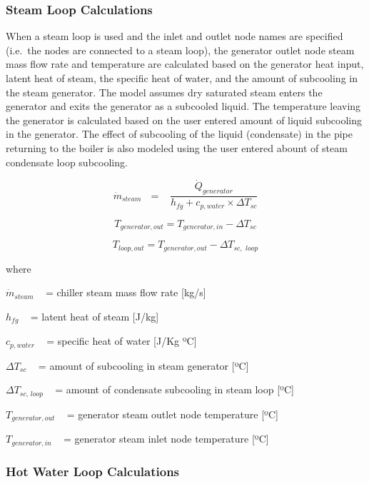 \subsubsection{Steam Loop Calculations}\label{steam-loop-calculations-1}

When a steam loop is used and the inlet and outlet node names are specified (i.e.~the nodes are connected to a steam loop), the generator outlet node steam mass flow rate and temperature are calculated based on the generator heat input, latent heat of steam, the specific heat of water, and the amount of subcooling in the steam generator. The model assumes dry saturated steam enters the generator and exits the generator as a subcooled liquid. The temperature leaving the generator is calculated based on the user entered amount of liquid subcooling in the generator. The effect of subcooling of the liquid (condensate) in the pipe returning to the boiler is also modeled using the user entered abount of steam condensate loop subcooling.

\begin{equation}
{\dot m_{steam}}\,\,\,\, = \,\,\,\,\,\frac{{{{\dot Q}_{generator}}}}{{{h_{fg}} + {c_{p,water}} \times \Delta {T_{sc}}}}
\end{equation}

\begin{equation}
{T_{generator,out}} = {T_{generator,in}} - \Delta {T_{sc}}
\end{equation}

\begin{equation}
{T_{loop,out}} = {T_{generator,out}} - \Delta {T_{sc,\,\,loop}}
\end{equation}

where

\({\dot m_{steam}}\) ~ = chiller steam mass flow rate {[}kg/s{]}

\({h_{fg}}\) ~ = latent heat of steam {[}J/kg{]}

\({c_{p,water}}\) ~ = specific heat of water {[}J/Kg ºC{]}

\(\Delta {T_{sc}}\) ~ = amount of subcooling in steam generator {[}ºC{]}

\(\Delta {T_{sc,\,loop}}\) ~ = amount of condensate subcooling in steam loop {[}ºC{]}

\({T_{generator,out}}\) ~ = generator steam outlet node temperature {[}ºC{]}

\({T_{generator,in}}\) ~ = generator steam inlet node temperature {[}ºC{]}

\subsubsection{Hot Water Loop Calculations}\label{hot-water-loop-calculations-1}

